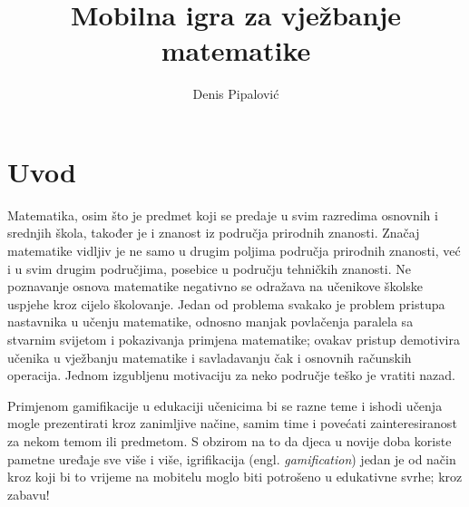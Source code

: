 \documentclass[times, utf8, zavrsni, numeric]{fer}
\begin{document}

\title{Mobilna igra za vježbanje matematike}

\author{Denis Pipalović}

\maketitle



\zahvala{}

\tableofcontents

\chapter{Uvod}
	Matematika, osim što je predmet koji se predaje u svim razredima osnovnih i srednjih škola, također je i znanost iz područja prirodnih znanosti.
Značaj matematike vidljiv je ne samo u drugim poljima područja prirodnih znanosti, već i u svim drugim područjima, posebice u području tehničkih znanosti.
Ne poznavanje osnova matematike negativno se odražava na učenikove školske uspjehe kroz cijelo školovanje\cite{matematika}. Jedan od problema svakako je problem pristupa nastavnika
 u učenju matematike, odnosno manjak povlačenja paralela sa stvarnim svijetom i pokazivanja primjena matematike; ovakav pristup demotivira učenika u vježbanju matematike
i savladavanju čak i osnovnih računskih operacija. Jednom izgubljenu motivaciju za neko područje teško je vratiti nazad.

Primjenom gamifikacije\cite{gamification} u edukaciji učenicima bi se razne teme i ishodi učenja mogle prezentirati kroz zanimljive načine, samim time i povećati zainteresiranost za nekom temom 
ili predmetom. S obzirom na to da djeca u novije doba koriste pametne uređaje sve više i više, igrifikacija (engl. \textit{gamification}) jedan je od način kroz koji bi to vrijeme na mobitelu moglo biti potrošeno
 u edukativne svrhe; kroz zabavu!
\end{document}
